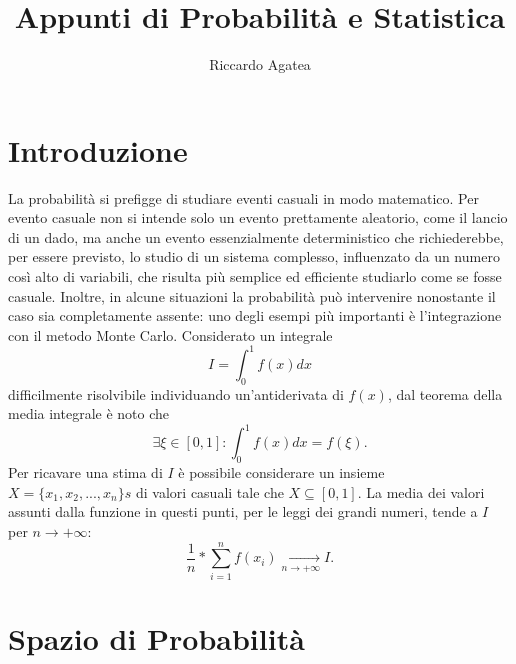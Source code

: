 \documentclass{article}
\title{Appunti di Probabilità e Statistica}
\author{Riccardo Agatea}
\theoremstyle{plain}
\theoremstyle{definition}
\theoremstyle{remark}
\begin{document}
\maketitle
\newpage
{}
\tableofcontents
\newpage
{}
\section{Introduzione} %
\label{sec:introduzione}
La probabilità si prefigge di studiare eventi casuali in modo matematico. Per evento casuale non si intende solo un evento prettamente aleatorio, come il lancio di un dado, ma anche un evento essenzialmente deterministico che richiederebbe, per essere previsto, lo studio di un sistema complesso, influenzato da un numero così alto di variabili, che risulta più semplice ed efficiente studiarlo come se fosse casuale. Inoltre, in alcune situazioni la probabilità può intervenire nonostante il caso sia completamente assente: uno degli esempi più importanti è l'integrazione con il metodo Monte Carlo. Considerato un integrale
\begin{equation*}
	I=\int_0^1 f(x)dx
\end{equation*}
difficilmente risolvibile individuando un'antiderivata di $f(x)$, dal teorema della media integrale è noto che
\begin{equation*}
	\exists\xi\in [0,1]\colon\int_0^1 f(x)dx=f(\xi)\text{.}
\end{equation*}
Per ricavare una stima di $I$ è possibile considerare un insieme $X=\{x_1,x_2,...,x_n\}s$ di valori casuali tale che $X\subseteq [0,1]$. La media dei valori assunti dalla funzione in questi punti, per le leggi dei grandi numeri, tende a $I$ per $n\to+\infty$:
\begin{equation*}
	\frac{1}{n}*\sum_{i=1}^{n}f(x_i)\xrightarrow[n\to+\infty]{}I\text{.}
\end{equation*}
\section{Spazio di Probabilità} %
\label{sec:spazio_di_probabilità}
\end{document}
